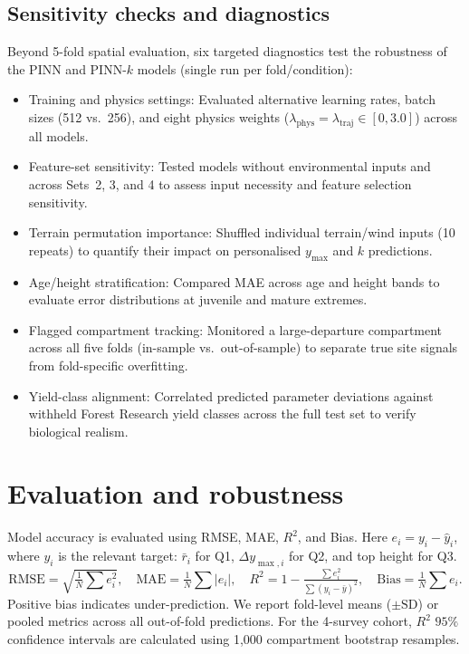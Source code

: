 \documentclass[logo,msc,ai]{infthesis}           %
\begin{document}
\subsection*{Sensitivity checks and diagnostics}
Beyond 5-fold spatial evaluation, six targeted diagnostics test the robustness of the PINN and PINN-$k$ models (single run per fold/condition):
\begin{itemize}
\setlength\itemsep{1pt}
\item Training and physics settings: Evaluated alternative learning rates, batch sizes (512 vs.\ 256), and eight physics weights ($\lambda_{\mathrm{phys}} = \lambda_{\mathrm{traj}} \in [0, 3.0]$) across all models.
\item Feature-set sensitivity: Tested models without environmental inputs and across Sets~2, 3, and 4 to assess input necessity and feature selection sensitivity.
\item Terrain permutation importance: Shuffled individual terrain/wind inputs (10 repeats) to quantify their impact on personalised $y_{\max}$ and $k$ predictions.
\item Age/height stratification: Compared MAE across age and height bands to evaluate error distributions at juvenile and mature extremes.
\item Flagged compartment tracking: Monitored a large-departure compartment across all five folds (in-sample vs.\ out-of-sample) to separate true site signals from fold-specific overfitting.
\item Yield-class alignment: Correlated predicted parameter deviations against withheld Forest Research yield classes across the full test set to verify biological realism.
\end{itemize}


\section{Evaluation and robustness} \label{sec:eval-robustness}
Model accuracy is evaluated using RMSE, MAE, $R^2$, and Bias. Here $e_i = y_i - \hat y_i$, where $y_i$ is the relevant target: $\bar r_i$ for Q1, $\Delta y_{\max,i}$ for Q2, and top height for Q3.
\begin{equation}
\mathrm{RMSE}=\sqrt{\tfrac{1}{N}\textstyle\sum e_i^2}, \quad
\mathrm{MAE}=\tfrac{1}{N}\textstyle\sum |e_i|, \quad
R^2=1-\tfrac{\sum e_i^2}{\sum (y_i-\bar y)^2}, \quad
\mathrm{Bias}=\tfrac{1}{N}\textstyle\sum e_i.
\label{eq:eval-summary}
\end{equation}
Positive bias indicates under-prediction. We report fold-level means ($\pm\text{SD}$) or pooled metrics across all out-of-fold predictions. For the 4-survey cohort, $R^2$ $95\%$ confidence intervals are calculated using 1,000 compartment bootstrap resamples.
\end{document}
